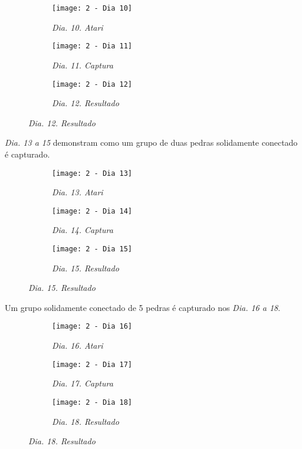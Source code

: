 \begin{figure}[h]
    \centering
    \begin{subfigure}{.3\textwidth}
        \centering
        \texttt{[image: 2 - Dia 10]}
        \caption*{\emph{Dia. 10. Atari}}
    \end{subfigure}
    \begin{subfigure}{.3\textwidth}
        \centering
        \texttt{[image: 2 - Dia 11]}
        \caption*{\emph{Dia. 11. Captura}}
    \end{subfigure}
    \begin{subfigure}{.3\textwidth}
        \centering
        \texttt{[image: 2 - Dia 12]}
        \caption*{\emph{Dia. 12. Resultado}}
    \end{subfigure}
\end{figure}

\emph{Dia. 13 a 15} demonstram  como um grupo de duas pedras solidamente conectado é capturado.

\begin{figure}[h]
    \centering
    \begin{subfigure}{.3\textwidth}
        \centering
        \texttt{[image: 2 - Dia 13]}
        \caption*{\emph{Dia. 13. Atari}}
    \end{subfigure}
    \begin{subfigure}{.3\textwidth}
        \centering
        \texttt{[image: 2 - Dia 14]}
        \caption*{\emph{Dia. 14. Captura}}
    \end{subfigure}
    \begin{subfigure}{.3\textwidth}
        \centering
        \texttt{[image: 2 - Dia 15]}
        \caption*{\emph{Dia. 15. Resultado}}
    \end{subfigure}
\end{figure}

Um grupo solidamente conectado de 5 pedras é capturado nos \emph{Dia. 16 a 18}.

\begin{figure}[h]
    \centering
    \begin{subfigure}{.3\textwidth}
        \centering
        \texttt{[image: 2 - Dia 16]}
        \caption*{\emph{Dia. 16. Atari}}
    \end{subfigure}
    \begin{subfigure}{.3\textwidth}
        \centering
        \texttt{[image: 2 - Dia 17]}
        \caption*{\emph{Dia. 17. Captura}}
    \end{subfigure}
    \begin{subfigure}{.3\textwidth}
        \centering
        \texttt{[image: 2 - Dia 18]}
        \caption*{\emph{Dia. 18. Resultado}}
    \end{subfigure}
\end{figure}

